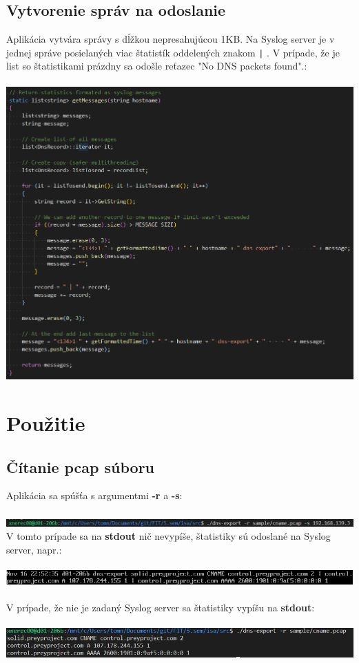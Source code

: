 \documentclass{article}
\begin{document}
        \subsection{Vytvorenie správ na odoslanie}
        Aplikácia vytvára správy s dĺžkou nepresahujúcou 1KB. Na Syslog server je v jednej správe posielaných viac štatistík oddelených znakom \texttt{|} .
        V prípade, že je list so štatistikami prázdny sa odošle reťazec "No DNS packets found".:\\\\
        \includegraphics[scale=0.6]{messages.png}

        \newpage
        
    \section{Použitie}
        \subsection{Čítanie pcap súboru}
        \noindent
        Aplikácia sa spúšťa s argumentmi \textbf{-r} a \textbf{-s}:\\\\
        \includegraphics[scale=0.6]{r1.png}
        V tomto prípade sa na \textbf{stdout} nič nevypíše, štatistiky sú odoslané na Syslog server, napr.:\\\\
        \includegraphics[scale=0.6]{r2.png}\\\\
        V prípade, že nie je zadaný Syslog server sa štatistiky vypíšu na \textbf{stdout}:\\\\
        \includegraphics[scale=0.6]{r3.png}
\end{document}
